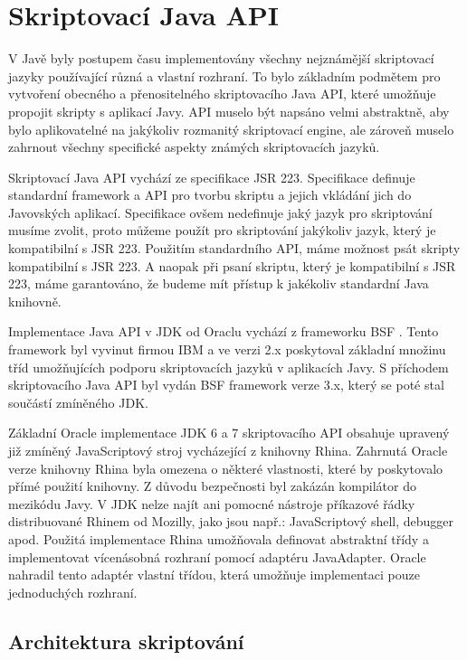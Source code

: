 \section{Skriptovací Java API}
\label{Chapter.JavaScriptInJavaAnalysis.ScriptingJavaAPI}

V Javě byly postupem času implementovány všechny nejznámější skriptovací jazyky používající různá a vlastní rozhraní. To bylo základním podmětem pro vytvoření obecného a přenositelného skriptovacího Java API, které umožňuje propojit skripty s aplikací Javy. API muselo být napsáno velmi abstraktně, aby bylo aplikovatelné na jakýkoliv rozmanitý skriptovací engine, ale zároveň muselo zahrnout všechny specifické aspekty známých skriptovacích jazyků. \cite{Bibliography.JavaAPI.Script.Book}

Skriptovací Java API vychází ze specifikace JSR 223. Specifikace definuje standardní framework a API pro tvorbu skriptu a jejich vkládání jich do Javovských aplikací. Specifikace ovšem nedefinuje jaký jazyk pro skriptování musíme zvolit, proto můžeme použít pro skriptování jakýkoliv jazyk, který je kompatibilní s JSR 223. Použitím standardního API, máme možnost psát skripty kompatibilní s JSR 223. A naopak při psaní skriptu, který je kompatibilní s JSR 223, máme garantováno, že budeme mít přístup k jakékoliv standardní Java knihovně.

Implementace Java API v JDK od Oraclu vychází z frameworku BSF \cite{Bibliography.BSF.Framework}. Tento framework byl vyvinut firmou IBM a ve verzi 2.x poskytoval základní množinu tříd umožňujících podporu skriptovacích jazyků v aplikacích Javy. S příchodem skriptovacího Java API byl vydán BSF framework verze 3.x, který se poté stal součástí zmíněného JDK.

Základní Oracle implementace JDK 6 a 7 skriptovacího API obsahuje upravený již zmíněný JavaScriptový stroj vycházející z knihovny Rhina. Zahrnutá Oracle verze knihovny Rhina byla omezena o některé vlastnosti, které by poskytovalo přímé použití knihovny. Z důvodu bezpečnosti byl zakázán kompilátor do mezikódu Javy. V JDK nelze najít ani pomocné nástroje příkazové řádky distribuované Rhinem od Mozilly, jako jsou např.: JavaScriptový shell, debugger apod. Použitá implementace Rhina umožňovala definovat abstraktní třídy a implementovat vícenásobná rozhraní pomocí adaptéru JavaAdapter. Oracle nahradil tento adaptér vlastní třídou, která umožňuje implementaci pouze jednoduchých rozhraní. 

\subsection{Architektura skriptování}
\label{Chapter.JavaScriptInJavaAnalysis.ScriptingJavaAPI.ArchitectureOfScripting}

